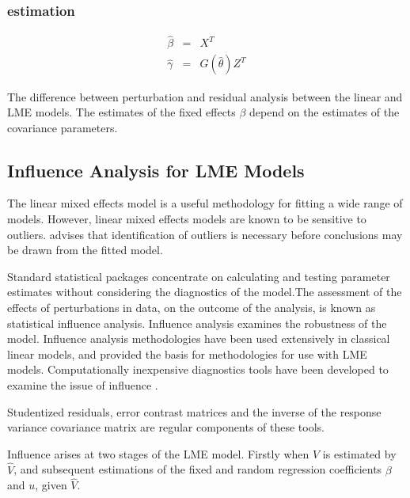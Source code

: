\documentclass[12pt, a4paper]{report}
\theoremstyle{plain}
\theoremstyle{definition}
\theoremstyle{remark}
\begin{document}
	\subsubsection{estimation}
	
	\begin{eqnarray}
	\hat{\beta} &=& X^{T} \\
	\hat{\gamma} &=& G(\hat{\theta})Z^{T}
	\end{eqnarray}
	
	The difference between perturbation and residual analysis between the linear and LME models.
	The estimates of the fixed effects $\beta$ depend on the estimates of the covariance parameters.
	
	
	
	
\subsection{Influence Analysis for LME Models} %
The linear mixed effects model is a useful methodology for fitting a wide range of models. However, linear mixed effects models are known to be sensitive to outliers. \citet{CPJ} advises that identification of outliers is necessary before conclusions may be drawn from the fitted model.

Standard statistical packages concentrate on calculating and testing parameter estimates without considering the diagnostics of the model.The assessment of the effects of perturbations in data, on the outcome of the analysis, is known as statistical influence analysis. Influence analysis examines the robustness of the model. Influence analysis methodologies have been used extensively in classical linear models, and provided the basis for methodologies for use with LME models.
Computationally inexpensive diagnostics tools have been developed to examine the issue of influence \citep{Zewotir}.

Studentized residuals, error contrast matrices and the inverse of the response variance covariance matrix are regular components of these tools.

Influence arises at two stages of the LME model. Firstly when $V$ is estimated by $\hat{V}$, and subsequent
estimations of the fixed and random regression coefficients $\beta$ and $u$, given $\hat{V}$.
\end{document}
